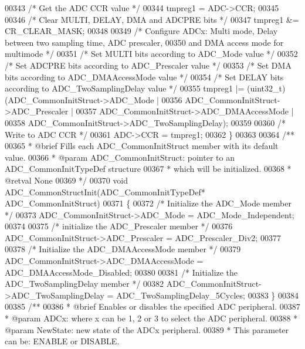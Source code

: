 \begin{DoxyCode}
00343   \textcolor{comment}{/* Get the ADC CCR value */}
00344   tmpreg1 = ADC->CCR;
00345 
00346   \textcolor{comment}{/* Clear MULTI, DELAY, DMA and ADCPRE bits */}
00347   tmpreg1 &= CR_CLEAR_MASK;
00348 
00349   \textcolor{comment}{/* Configure ADCx: Multi mode, Delay between two sampling time, ADC prescaler,}
00350 \textcolor{comment}{     and DMA access mode for multimode */}
00351   \textcolor{comment}{/* Set MULTI bits according to ADC\_Mode value */}
00352   \textcolor{comment}{/* Set ADCPRE bits according to ADC\_Prescaler value */}
00353   \textcolor{comment}{/* Set DMA bits according to ADC\_DMAAccessMode value */}
00354   \textcolor{comment}{/* Set DELAY bits according to ADC\_TwoSamplingDelay value */}
00355   tmpreg1 |= (uint32\_t)(ADC\_CommonInitStruct->ADC_Mode |
00356                         ADC\_CommonInitStruct->ADC_Prescaler |
00357                         ADC\_CommonInitStruct->ADC_DMAAccessMode |
00358                         ADC\_CommonInitStruct->ADC_TwoSamplingDelay);
00359 
00360   \textcolor{comment}{/* Write to ADC CCR */}
00361   ADC->CCR = tmpreg1;
00362 \}
00363 
00364 \textcolor{comment}{/**}
00365 \textcolor{comment}{  * @brief  Fills each ADC\_CommonInitStruct member with its default value.}
00366 \textcolor{comment}{  * @param  ADC\_CommonInitStruct: pointer to an ADC\_CommonInitTypeDef structure}
00367 \textcolor{comment}{  *         which will be initialized.}
00368 \textcolor{comment}{  * @retval None}
00369 \textcolor{comment}{  */}
00370 \textcolor{keywordtype}{void} ADC_CommonStructInit(ADC\_CommonInitTypeDef* ADC\_CommonInitStruct)
00371 \{
00372   \textcolor{comment}{/* Initialize the ADC\_Mode member */}
00373   ADC\_CommonInitStruct->ADC_Mode = ADC_Mode_Independent;
00374 
00375   \textcolor{comment}{/* initialize the ADC\_Prescaler member */}
00376   ADC\_CommonInitStruct->ADC_Prescaler = ADC_Prescaler_Div2;
00377 
00378   \textcolor{comment}{/* Initialize the ADC\_DMAAccessMode member */}
00379   ADC\_CommonInitStruct->ADC_DMAAccessMode = ADC_DMAAccessMode_Disabled;
00380 
00381   \textcolor{comment}{/* Initialize the ADC\_TwoSamplingDelay member */}
00382   ADC\_CommonInitStruct->ADC_TwoSamplingDelay = ADC_TwoSamplingDelay_5Cycles;
00383 \}
00384 
00385 \textcolor{comment}{/**}
00386 \textcolor{comment}{  * @brief  Enables or disables the specified ADC peripheral.}
00387 \textcolor{comment}{  * @param  ADCx: where x can be 1, 2 or 3 to select the ADC peripheral.}
00388 \textcolor{comment}{  * @param  NewState: new state of the ADCx peripheral. }
00389 \textcolor{comment}{  *          This parameter can be: ENABLE or DISABLE.}

\end{DoxyCode}
